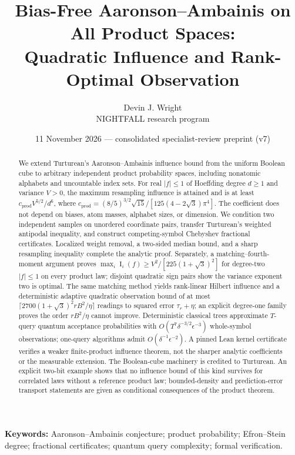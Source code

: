 \documentclass[11pt]{article}
\title{Bias-Free Aaronson--Ambainis on All Product Spaces:\\[2pt]\large Quadratic Influence and Rank-Optimal Observation}
\author{Devin J. Wright\\\small NIGHTFALL research program}
\date{11 November 2026 --- consolidated specialist-review preprint (v7)}
\numberwithin{equation}{section}
\theoremstyle{remark}
\newcommand{\Inf}{\operatorname{I}}
\newcommand{\cprod}{c_{\mathrm{prod}}}
\begin{document}
\maketitle
\begin{abstract}
We extend Turturean's Aaronson--Ambainis influence bound from the uniform Boolean cube to arbitrary independent product probability spaces, including nonatomic alphabets and uncountable index sets. For real $|f|\le1$ of Hoeffding degree $d\ge1$ and variance $V>0$, the maximum resampling influence is attained and is at least $\cprod V^{5/2}/d^6$, where $\cprod=(8/5)^{3/2}\sqrt{15}/[125(4-2\sqrt3)\pi^4]$. The coefficient does not depend on biases, atom masses, alphabet sizes, or dimension. We condition two independent samples on unordered coordinate pairs, transfer Turturean's weighted antipodal inequality, and construct competing-symbol Chebyshev fractional certificates. Localized weight removal, a two-sided median bound, and a sharp resampling inequality complete the analytic proof. Separately, a matching--fourth-moment argument proves $\max_i\Inf_i(f)\ge V^2/[225(1+\sqrt3)^2]$ for degree-two $|f|\le1$ on every product law; disjoint quadratic sign pairs show the variance exponent two is optimal. The same matching method yields rank-linear Hilbert influence and a deterministic adaptive quadratic observation bound of at most $\lceil2700(1+\sqrt3)^2rB^2/\eta\rceil$ readings to squared error $\tau_r+\eta$; an explicit degree-one family proves the order $rB^2/\eta$ cannot improve. Deterministic classical trees approximate $T$-query quantum acceptance probabilities with $O(T^7\delta^{-3/2}\epsilon^{-3})$ whole-symbol observations; one-query algorithms admit $O(\delta^{-1}\epsilon^{-2})$. A pinned Lean kernel certificate verifies a weaker finite-product influence theorem, not the sharper analytic coefficients or the measurable extension. The Boolean-cube machinery is credited to Turturean. An explicit two-bit example shows that no influence bound of this kind survives for correlated laws without a reference product law; bounded-density and prediction-error transport statements are given as conditional consequences of the product theorem.
\end{abstract}
\noindent\textbf{Keywords:} Aaronson--Ambainis conjecture; product probability; Efron--Stein degree; fractional certificates; quantum query complexity; formal verification.
\end{document}
